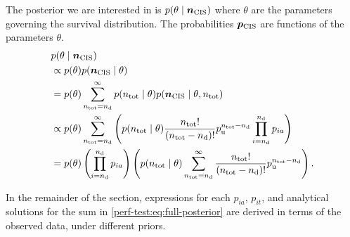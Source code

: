 \documentclass[thesis.tex]{subfiles}
\begin{document}
The posterior we are interested in is $p(\theta \mid \bm{n_\text{CIS}})$ where $\theta$ are the parameters governing the survival distribution.
The probabilities $\bm{p_\text{CIS}}$ are functions of the parameters $\theta$.
\begin{align}
&p(\theta \mid \bm{n_\text{CIS}}) \\
&\propto p(\theta) p(\bm{n_\text{CIS}} \mid \theta) \\
&= p(\theta) \sum_{n_\text{tot}=n_\text{d}}^\infty p(n_\text{tot} \mid \theta) p(\bm{n_\text{CIS}} \mid \theta, n_\text{tot}) \\
&\propto p(\theta) \sum_{n_\text{tot}=n_\text{d}}^\infty \left( p(n_\text{tot} \mid \theta) \frac{n_\text{tot}!}{(n_\text{tot} - n_\text{d})!} p_\text{u}^{n_\text{tot} - n_\text{d}} \prod_{i=n_\text{d}}^{n_\text{d}} p_{ia} \right) \\
&= p(\theta) \left( \prod_{i=n_\text{d}}^{n_\text{d}} p_{ia} \right) \left( p(n_\text{tot} \mid \theta) \sum_{n_\text{tot}=n_\text{d}}^\infty \frac{n_\text{tot}!}{(n_\text{tot} - n_\text{d})!} p_\text{u}^{n_\text{tot} - n_\text{d}} \right) \label{perf-test:eq:full-posterior}.
\end{align}

In the remainder of the section, expressions for each $p_{ia}$, $p_{it}$, and analytical solutions for the sum in \cref{perf-test:eq:full-posterior} are derived in terms of the observed data, under different priors.
\end{document}
